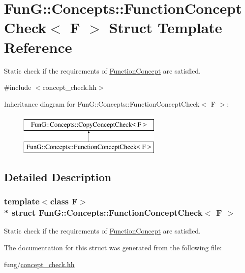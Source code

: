 \hypertarget{structFunG_1_1Concepts_1_1FunctionConceptCheck}{}\section{FunG\+:\+:Concepts\+:\+:Function\+Concept\+Check$<$ F $>$ Struct Template Reference}
\label{structFunG_1_1Concepts_1_1FunctionConceptCheck}


Static check if the requirements of \hyperlink{structFunG_1_1Concepts_1_1FunctionConcept}{Function\+Concept} are satisfied.  




{\ttfamily \#include $<$concept\+\_\+check.\+hh$>$}

Inheritance diagram for FunG\+:\+:Concepts\+:\+:Function\+Concept\+Check$<$ F $>$\+:\begin{figure}[H]
\begin{center}
\leavevmode
\includegraphics[height=2.000000cm]{structFunG_1_1Concepts_1_1FunctionConceptCheck}
\end{center}
\end{figure}


\subsection{Detailed Description}
\subsubsection*{template$<$class F$>$\\*
struct Fun\+G\+::\+Concepts\+::\+Function\+Concept\+Check$<$ F $>$}

Static check if the requirements of \hyperlink{structFunG_1_1Concepts_1_1FunctionConcept}{Function\+Concept} are satisfied. 

The documentation for this struct was generated from the following file\+:\begin{DoxyCompactItemize}
\item 
fung/\hyperlink{concept__check_8hh}{concept\+\_\+check.\+hh}\end{DoxyCompactItemize}
